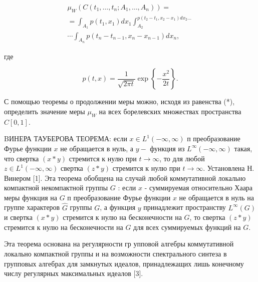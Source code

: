 \documentclass[10pt]{article}
\begin{document}
\[

\begin{gathered}

\mu_{W}\left(C\left(t_{1}, \ldots, t_{n} ; A_{1}, \ldots, A_{n}\right)\right)= \\

=\int_{A_{1}} p\left(t_{1}, x_{1}\right) d x_{1} \int_{A_{2}}^{p\left(t_{2}-t_{1}, x_{2}-x_{1}\right) d x_{2} \ldots} \\

\cdots \int_{A_{n}} p\left(t_{n}-t_{n-1}, x_{n}-x_{n-1}\right) d x_{n},

\end{gathered}

\]



где



\[

p(t, x)=\frac{1}{\sqrt{2 \pi t}} \exp \left\{-\frac{x^{2}}{2 t}\right\} .

\]



С помощью теоремы о продолжении меры можно, исходя из равенства (*), определить значение меры $\mu_{W}$ на всех борелевских множествах пространства $C[0,1]$.



BИНЕРА ТАУБЕРОВА ТЕОРЕМА: если $x \in L^{1}(-\infty, \infty)$ п преобразование Фурье функции $x$ не обращается в нуль, а $y-$ функция из $L^{\infty}(-\infty, \infty)$ такая, что свертка $(x * y)$ стремится к нулю при $t \rightarrow \infty$, то для любой $z \in L^{1}(-\infty, \infty)$ свертка $(z * y)$ стремится к нулю при $t \rightarrow \infty$. Установлена Н. Винером [1]. Эта теорема обобщена на случай любой коммутативной локально компактной некомпактной группы $G$ : если $x$ - суммируемая относительно Хаара меры функция на $G$ п преобразование Фурье функции $x$ не обращается в нуль на группе характеров $\widehat{G}$ группы $G$, а функция $y$ принадлежит пространству $L^{\infty}(G)$ и свертка $(x * y)$ стремится к нулю на бесконечности на $G$, то свертка $(z * y)$ стремится к нулю на бесконечности на $G$ для всех суммируемых функций на $G$.



Эта теорема основана на регулярности гр упповой алгебры коммутативной локально компактной группы и на возможности спектрального синтеза в групповых алгебрах для замкнутых идеалов, принадлежащих лишь конечному числу регулярных максимальных идеалов [3].
\end{document}
